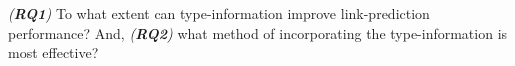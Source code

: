 \textit{(\textbf{RQ1})}
To what extent can type-information improve link-prediction performance? And,
\textit{(\textbf{RQ2})}
what method of incorporating the type-information is most effective?